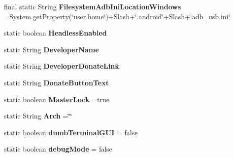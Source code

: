 \begin{DoxyCompactItemize}
\item 
\hypertarget{classCASUAL_1_1Statics_ad597fbbb72e94a38f12d21f6c594634f}{final static String {\bfseries Filesystem\-Adb\-Ini\-Location\-Windows} =System.\-get\-Property(\char`\"{}user.\-home\char`\"{})+Slash+\char`\"{}.android\char`\"{}+Slash+\char`\"{}adb\-\_\-usb.\-ini\char`\"{}}\label{classCASUAL_1_1Statics_ad597fbbb72e94a38f12d21f6c594634f}

\item 
\hypertarget{classCASUAL_1_1Statics_a06bb582767dae9d05dd9fb67520b7d33}{static boolean {\bfseries Headless\-Enabled}}\label{classCASUAL_1_1Statics_a06bb582767dae9d05dd9fb67520b7d33}

\item 
\hypertarget{classCASUAL_1_1Statics_a5a48520ba7f8227c192426e4aa735e6c}{static String {\bfseries Developer\-Name}}\label{classCASUAL_1_1Statics_a5a48520ba7f8227c192426e4aa735e6c}

\item 
\hypertarget{classCASUAL_1_1Statics_a2adfa4e077dcb2209d29c6d1f3fa43dd}{static String {\bfseries Developer\-Donate\-Link}}\label{classCASUAL_1_1Statics_a2adfa4e077dcb2209d29c6d1f3fa43dd}

\item 
\hypertarget{classCASUAL_1_1Statics_a0a9ca7587bb74d51ef497dca6c5827c6}{static String {\bfseries Donate\-Button\-Text}}\label{classCASUAL_1_1Statics_a0a9ca7587bb74d51ef497dca6c5827c6}

\item 
\hypertarget{classCASUAL_1_1Statics_a781337272c8a54edeae06b7e596ae3be}{static boolean {\bfseries Master\-Lock} =true}\label{classCASUAL_1_1Statics_a781337272c8a54edeae06b7e596ae3be}

\item 
\hypertarget{classCASUAL_1_1Statics_a6ff8e937bcbb80a2680503ecc1e64416}{static String {\bfseries Arch} =\char`\"{}\char`\"{}}\label{classCASUAL_1_1Statics_a6ff8e937bcbb80a2680503ecc1e64416}

\item 
\hypertarget{classCASUAL_1_1Statics_ac0da77437e6985fa83c6372e144a5ca8}{static boolean {\bfseries dumb\-Terminal\-G\-U\-I} = false}\label{classCASUAL_1_1Statics_ac0da77437e6985fa83c6372e144a5ca8}

\item 
\hypertarget{classCASUAL_1_1Statics_a3068a2e643dca83a03c95e199233da94}{static boolean {\bfseries debug\-Mode} = false}\label{classCASUAL_1_1Statics_a3068a2e643dca83a03c95e199233da94}


\end{DoxyCompactItemize}
